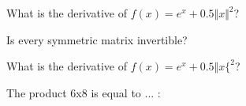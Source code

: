 \documentclass{amsart}
\begin{document}
\begin{category}
\begin{question}[essay]
What is the derivative of $f(x) = e^x + 0.5 \Vert x \Vert^2$?
\end{question}

\begin{question}[multichoice]
Is every symmetric matrix invertible?
\end{question}

\begin{question}[essay]
What is the derivative of $f(x) = e^x + 0.5 \Vert x \{^2$?
\end{question}
\begin{category}
\begin{question}[multichoice]
The product 6x8 is equal to ... :


\end{question}
\end{category}
\end{category}
\end{document}
